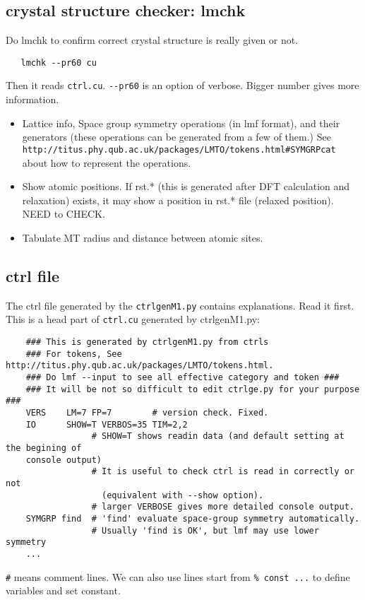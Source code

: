 \documentclass[a4paper,10pt,epsf,fleqn]{article}
\begin{document}
\subsection{crystal structure checker: lmchk}
Do lmchk to confirm correct crystal structure is really given or not.
\begin{verbatim}
   lmchk --pr60 cu 
\end{verbatim}
Then it reads \verb+ctrl.cu+. \verb+--pr60+ is an option of verbose. Bigger number gives more information.
\begin{itemize}
\item Lattice info, Space group symmetry operations (in lmf format), and
      their generators (these operations can be generated from a few of them.)
      See \verb+http://titus.phy.qub.ac.uk/packages/LMTO/tokens.html#SYMGRPcat+
      about how to represent the operations.
\item Show atomic positions. If rst.* (this is generated after DFT
      calculation and relaxation) exists, it may show a position in
      rst.* file (relaxed position). NEED to CHECK.
\item Tabulate MT radius and distance between atomic sites.
\end{itemize}

\subsection{ctrl file}
The ctrl file generated by the \verb+ctrlgenM1.py+ contains explanations. 
Read it first. This is a head part of \verb+ctrl.cu+ generated by ctrlgenM1.py:
\begin{verbatim}
    ### This is generated by ctrlgenM1.py from ctrls 
    ### For tokens, See http://titus.phy.qub.ac.uk/packages/LMTO/tokens.html. 
    ### Do lmf --input to see all effective category and token ###
    ### It will be not so difficult to edit ctrlge.py for your purpose ###
    VERS    LM=7 FP=7        # version check. Fixed.
    IO      SHOW=T VERBOS=35 TIM=2,2
                 # SHOW=T shows readin data (and default setting at the begining of 
    console output)
                 # It is useful to check ctrl is read in correctly or not
                   (equivalent with --show option).
                 # larger VERBOSE gives more detailed console output.
    SYMGRP find  # 'find' evaluate space-group symmetry automatically.
                 # Usually 'find is OK', but lmf may use lower symmetry
    ...
\end{verbatim}
\verb+#+ means comment lines. We can also use
lines start from \verb+% const ...+ to define variables and set constant.
\end{document}
